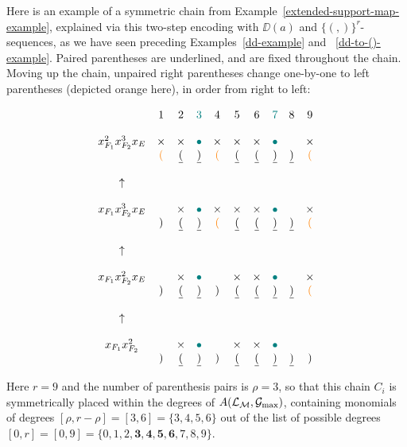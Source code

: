 \begin{example}\rm
\label{example-re-revisited}
Here is an example of a symmetric chain from Example~\ref{extended-support-map-example},
explained via this two-step encoding with $\DD(a)$ and
$\{(,)\}^r$-sequences, as we have seen preceding Examples~\ref{dd-example} and ~\ref{dd-to-()-example}. 
Paired parentheses are underlined, and are fixed throughout the chain. Moving up the chain, unpaired right parentheses change one-by-one to left parentheses (depicted {\color{orange} orange} here), in order from right to left:


\small
$$
\begin{array}{ccccccccccl}
 & 1 & 2 & {\color{teal}3} & 4 & 5 & 6 & {\color{teal}7} & 8 & 9 \\
    &  &  &  &  &  &  &  &  &  \\
x_{F_1}^2 x_{F_2}^3 x_E & \times & \times & {\color{teal}\bullet} & \times & \times & \times &{\color{teal}\bullet}  &  & \times\\
& {\color{orange}(} & \underline{(} & \underline{)} & {\color{orange}(} & \underline{(} & \underline{(} & \underline{)} & \underline{)} & {\color{orange}(}\\ 
    &  &  &  &  &  &  &  &  &  \\
 \uparrow &  &  &  &  &  &  &  &  &  \\
    &  &  &  &  &  &  &  &  &  \\
x_{F_1} x_{F_2}^3 x_E &  & \times & {\color{teal}\bullet} & \times & \times & \times &{\color{teal}\bullet}  &  & \times\\
& ) & \underline{(} & \underline{)} & {\color{orange}(} & \underline{(} & \underline{(} & \underline{)} & \underline{)} & {\color{orange}(}\\ 
    &  &  &  &  &  &  &  &  &  \\
 \uparrow &  &  &  &  &  &  &  &  &  \\
    &  &  &  &  &  &  &  &  &  \\
x_{F_1} x_{F_2}^2 x_E &  & \times & {\color{teal}\bullet} &  & \times & \times &{\color{teal}\bullet}  &  & \times\\
& ) & \underline{(} & \underline{)} & ) & \underline{(} & \underline{(} & \underline{)} & \underline{)} & {\color{orange}(}\\ 
   &  &  &  &  &  &  &  &  &  \\
 \uparrow &  &  &  &  &  &  &  &  &  \\
    &  &  &  &  &  &  &  &  &  \\
x_{F_1} x_{F_2}^2 
 &  & \times & {\color{teal}\bullet} &   & \times & \times &{\color{teal}\bullet}  &  &  \\
 & ) & \underline{(} & \underline{)} & ) & \underline{(} & \underline{(} & \underline{)} & \underline{)} & )\\ 
\end{array}
$$
\normalsize


Here $r=9$ and the number of parenthesis pairs is $\rho=3$, so that this chain $C_i$ is symmetrically placed within the degrees of $A(\mathcal{L}_{\mathcal{M}}, \mathcal{G}_{\max})$, containing monomials of degrees $[\rho,r-\rho]=[3,6]=\{3,4,5,6\}$ 
out of the list of possible degrees $[0,r]=[0,9]=\{0,1,2,\mathbf{3,4,5,6},7,8,9\}$. 
\end{example}
